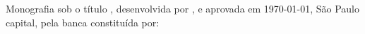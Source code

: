 \setlength{\ABNTsignthickness}{0.4pt}
\setlength{\ABNTsignskip}{2cm}


% 
% 
% 
%   
%       
%       
% 


\begin{folhadeaprovacao}

Monografia sob o t\'itulo \ABNTtitulodata , desenvolvida por \ABNTautordata , e aprovada em \today , S\~ao Paulo capital, pela banca constitu\'ida por:
\end{folhadeaprovacao}

